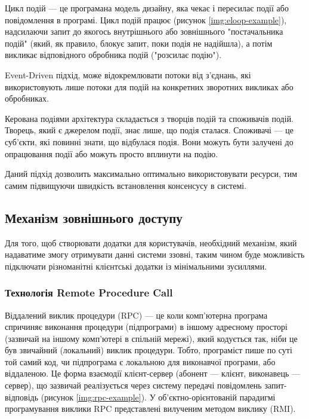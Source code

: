 \documentclass{lib/styles/default-style}
\begin{document}
    Цикл подій --- це програмана модель дизайну, яка чекає і пересилає події або повідомлення в програмі.
    Цикл подій працює (рисунок \ref{img:eloop-example}), надсилаючи запит до якогось внутрішнього або зовнішнього "постачальника подій"
    (який, як правило, блокує запит, поки подія не надійшла), а потім викликає відповідного обробника подій ("розсилає подію").

    Event-Driven підхід, може відокремлювати потоки від з'єднань,
    які використовують лише потоки для подій на конкретних зворотних викликах або обробниках.


    Керована подіями архітектура складається з творців подій та споживачів подій.
    Творець, який є джерелом події, знає лише, що подія сталася.
    Споживачі --- це суб'єкти, які повинні знати, що відбулася подія.
    Вони можуть бути залучені до опрацювання події або можуть просто вплинути на подію.

    Даний підхід дозволить максимально оптимально використовувати ресурси, тим самим підвищуючи швидкість встановлення консенсусу в системі.

\subsection{Механізм зовнішнього доступу}

    Для того, щоб створювати додатки для користувачів, необхідний механізм, який надаватиме змогу отримувати данні системи ззовні,
    таким чином буде можливість підключати різноманітні клієнтські додатки із мінімальними зусиллями.

    \subsubsection{Технологія Remote Procedure Call}

    Віддалений виклик процедури (RPC) --- це коли комп'ютерна програма спричиняє виконання процедури (підпрограми) в
    іншому адресному просторі (зазвичай на іншому комп’ютері в спільній мережі),
    який кодується так, ніби це був звичайний (локальний) виклик процедури.
    Тобто, програміст пише по суті той самий код, чи підпрограма є локальною для виконавчої програми, або віддаленою.
    Це форма взаємодії клієнт-сервер (абонент --- клієнт, виконавець --- сервер), що зазвичай реалізується через систему передачі
    повідомлень запит-відповідь (рисунок \ref{img:rpc-example}). У об'єктно-орієнтованій парадигмі програмування виклики RPC
    представлені вилученим методом виклику (RMI).
\end{document}
